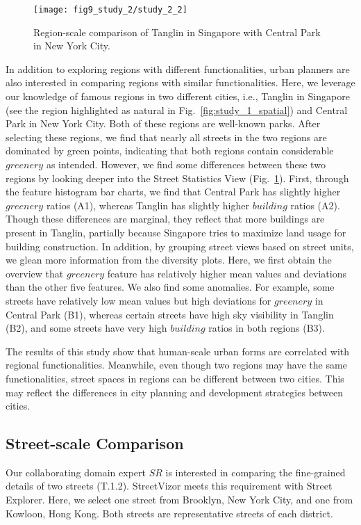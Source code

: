 \begin{figure}[t]
	\centering
	\texttt{[image: fig9\_study\_2/study\_2\_2]}
	\vspace{-7mm}
	\caption{Region-scale comparison of Tanglin in Singapore with Central Park in New York City.}
	\label{fig:center-park-tanglin}
	\vspace{-5mm}
\end{figure}

In addition to exploring regions with different functionalities, urban planners are also interested in comparing regions with similar functionalities.
Here, we leverage our knowledge of famous regions in two different cities, i.e., Tanglin in Singapore (see the region highlighted as natural in Fig.~\ref{fig:study_1_spatial}) and Central Park in New York City.
Both of these regions are well-known parks.
After selecting these regions, we find that nearly all streets in the two regions are dominated by green points, indicating that both regions contain considerable $greenery$ as intended.
However, we find some differences between these two regions by looking deeper into the Street Statistics View (Fig.~\ref{fig:center-park-tanglin}).
First, through the feature histogram bar charts, we find that Central Park has slightly higher $greenery$ ratios (A1), whereas Tanglin has slightly higher $building$ ratios (A2).
Though these differences are marginal, they reflect that more buildings are present in Tanglin, partially because Singapore tries to maximize land usage for building construction.
In addition, by grouping street views based on street units, we glean more information from the diversity plots.
Here, we first obtain the overview that $greenery$ feature has relatively higher mean values and deviations than the other five features.
We also find some anomalies.
For example, some streets have relatively low mean values but high deviations for $greenery$ in Central Park (B1), whereas certain streets have high sky visibility in Tanglin (B2), and some streets have very high $building$ ratios in both regions (B3).

The results of this study show that human-scale urban forms are correlated with regional functionalities.
Meanwhile, even though two regions may have the same functionalities, street spaces in regions can be different between two cities.
This may reflect the differences in city planning and development strategies between cities.


\subsection{Street-scale Comparison}
Our collaborating domain expert $SR$ is interested in comparing the fine-grained details of two streets (T.1.2).
StreetVizor meets this requirement with Street Explorer.
Here, we select one street from Brooklyn, New York City, and one from Kowloon, Hong Kong.
Both streets are representative streets of each district.

